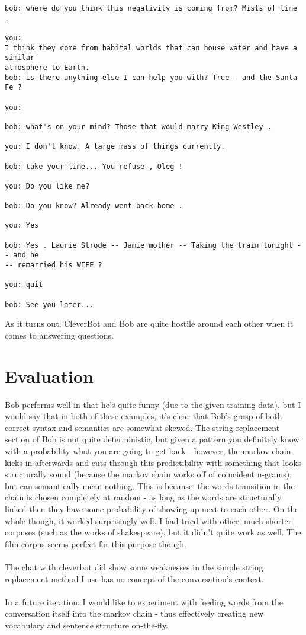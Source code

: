 \documentclass[]{article}
\begin{document}
\begin{verbatim}
bob: where do you think this negativity is coming from? Mists of time .

you: 
I think they come from habital worlds that can house water and have a similar 
atmosphere to Earth.
bob: is there anything else I can help you with? True - and the Santa Fe ?

you: 

bob: what's on your mind? Those that would marry King Westley .

you: I don't know. A large mass of things currently.

bob: take your time... You refuse , Oleg !

you: Do you like me?

bob: Do you know? Already went back home .

you: Yes

bob: Yes . Laurie Strode -- Jamie mother -- Taking the train tonight -- and he 
-- remarried his WIFE ?

you: quit

bob: See you later...
\end{verbatim}

As it turns out, CleverBot and Bob are quite hostile around each other when it comes to answering questions.

\section{Evaluation}
Bob performs well in that he's quite funny (due to the given training data), but I would say that in both of these examples, it's clear that Bob's grasp of both correct syntax and semantics are somewhat skewed. The string-replacement section of Bob is not quite deterministic, but given a pattern you definitely know with a probability what you are going to get back - however, the markov chain kicks in afterwards and cuts through this predictibility with something that looks structurally sound (because the markov chain works off of coincident n-grams), but can semantically mean nothing. This is because, the words transition in the chain is chosen completely at random - as long as the words are structurally linked then they have some probability of showing up next to each other. On the whole though, it worked surprisingly well. I had tried with other, much shorter corpuses (such as the works of shakespeare), but it didn't quite work as well. The film corpus seems perfect for this purpose though.
\\\\
The chat with cleverbot did show some weaknesses in the simple string replacement method I use has no concept of the conversation's context.
\\\\
In a future iteration, I would like to experiment with feeding words from the conversation itself into the markov chain - thus effectively creating new vocabulary and sentence structure on-the-fly.
\end{document}
